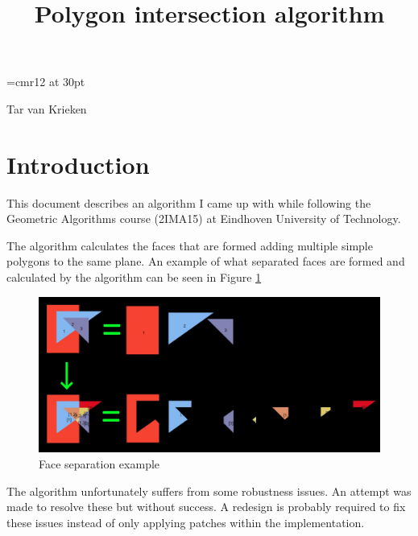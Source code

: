 \documentclass[12pt]{article}
\begin{document}

\begin{center}
    \font\myfont=cmr12 at 30pt
    \title*{\myfont Polygon intersection algorithm}
\end{center}

\begin{center}
    Tar van Krieken
\end{center}

\vspace{8mm}

\section*{Introduction}
This document describes an algorithm I came up with while following the Geometric Algorithms course (2IMA15) at Eindhoven University of Technology.

The algorithm calculates the faces that are formed adding multiple simple polygons to the same plane. An example of what separated faces are formed and calculated by the algorithm can be seen in Figure \ref{fig:intersectionExample}

\begin{figure}[!htb]
    \includegraphics[width=\linewidth]{Images/intersectionExample.jpg}
    \caption{Face separation example}
    \label{fig:intersectionExample}
\end{figure}

The algorithm unfortunately suffers from some robustness issues. An attempt was made to resolve these but without success. A redesign is probably required to fix these issues instead of only applying patches within the implementation.
\end{document}
